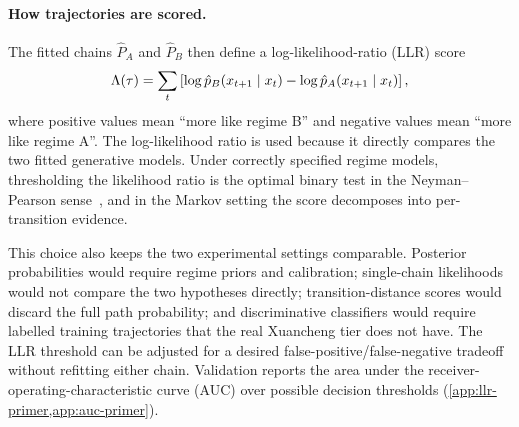 \paragraph{How trajectories are scored.}
The fitted chains $\hat{P}_A$ and $\hat{P}_B$ then define a
log-likelihood-ratio (LLR) score\label{sec:detector}
\[
\Lambda(\tau)=\sum_t \left[\log \hat{p}_B(x_{t+1}\mid x_t)
-\log \hat{p}_A(x_{t+1}\mid x_t)\right],
\]
where positive values mean ``more like regime B'' and negative values
mean ``more like regime A''. The log-likelihood ratio is used because it
directly compares the two fitted generative models. Under correctly
specified regime models, thresholding the likelihood ratio is the optimal
binary test in the Neyman--Pearson sense~\cite{neyman1933}, and in the
Markov setting the score decomposes into per-transition evidence.

This choice also keeps the two experimental settings comparable.
Posterior probabilities would require regime priors and calibration;
single-chain likelihoods would not compare the two hypotheses directly;
transition-distance scores would discard the full path probability; and
discriminative classifiers would require labelled training trajectories
that the real Xuancheng tier does not have. The LLR threshold can be
adjusted for a desired false-positive/false-negative tradeoff without
refitting either chain. Validation reports the area under the
receiver-operating-characteristic curve (AUC) over possible decision
thresholds
(\cref{app:llr-primer,app:auc-primer}).


